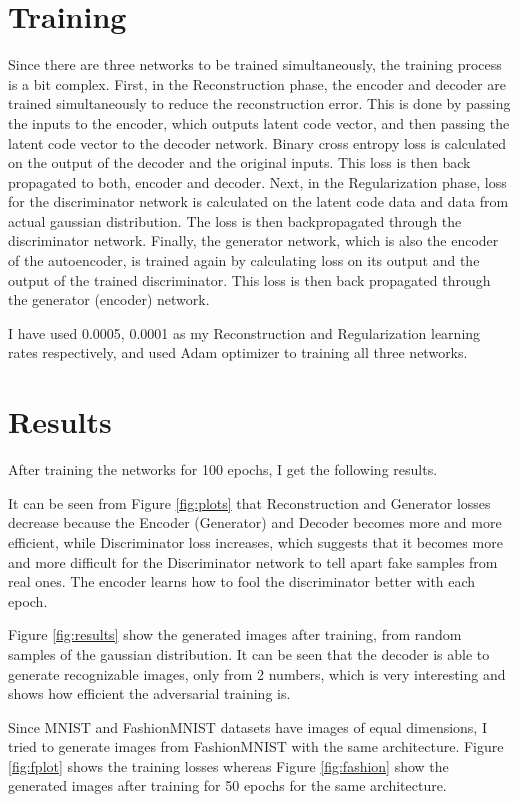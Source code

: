 \documentclass[11pt]{article}
\begin{document}
\section{Training}

Since there are three networks to be trained simultaneously, the training
process is a bit complex. First, in the Reconstruction phase, the encoder
and decoder are trained simultaneously to reduce the reconstruction error. This
is done by passing the inputs to the encoder, which outputs latent code vector,
and then passing the latent code vector to the decoder network. Binary cross
entropy loss is calculated on the output of the decoder and the original inputs.
This loss is then back propagated to both, encoder and decoder.
Next, in the Regularization phase, loss for the discriminator network is calculated
on the latent code data and data from actual gaussian distribution. The loss
is then backpropagated through the discriminator network. Finally, the
generator network, which is also the encoder of the autoencoder, is trained
again by calculating loss on its output and the output of the trained discriminator.
This loss is then back propagated through the generator (encoder) network.

I have used 0.0005, 0.0001 as my Reconstruction and Regularization
learning rates respectively, and used Adam optimizer to training all three
networks.

\section{Results}

After training the networks for 100 epochs, I get the following results.

It can be seen from Figure \ref{fig:plots} that Reconstruction and Generator
losses decrease because the Encoder (Generator) and Decoder becomes more and
more efficient, while Discriminator loss increases, which suggests that it
becomes more and more difficult for the Discriminator network to tell apart
fake samples from real ones. The encoder learns how to fool the discriminator
better with each epoch.

Figure \ref{fig:results} show the generated images after training, from random
samples of the gaussian distribution. It can be seen that the decoder is able to
generate recognizable images, only from 2 numbers, which is very interesting
and shows how efficient the adversarial training is.

Since MNIST and FashionMNIST datasets have images of equal dimensions, I tried
to generate images from FashionMNIST with the same architecture. Figure
\ref{fig:fplot} shows the training losses whereas Figure \ref{fig:fashion}
show the generated images after training for 50 epochs for the same architecture.
\end{document}
